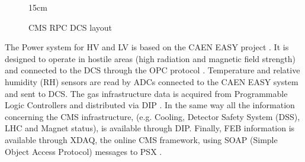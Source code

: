 \begin{figure}[!htm]{15cm} %
\caption{CMS RPC DCS layout}%
\label{fig:RPC_DCS_layout}
\end{figure}

The Power system for HV and LV is based on the CAEN EASY project \cite{CAENEASY}. It is designed to operate in hostile areas (high radiation and magnetic field strength) and connected to the DCS through the OPC protocol \cite{OPCFoundation}.  Temperature and relative humidity (RH) sensors are read by ADCs connected to the CAEN EASY system and sent to DCS. The gas infrastructure data is acquired from Programmable Logic Controllers and distributed via DIP \cite{Barillere:2003fi}. In the same way all the information concerning the CMS infrastructure, (e.g. Cooling, Detector Safety System (DSS), LHC and Magnet status), is available through DIP. Finally, FEB information is available through XDAQ, the online CMS framework, using SOAP (Simple Object Access Protocol)  messages to PSX \cite{gutleber2002software}.

